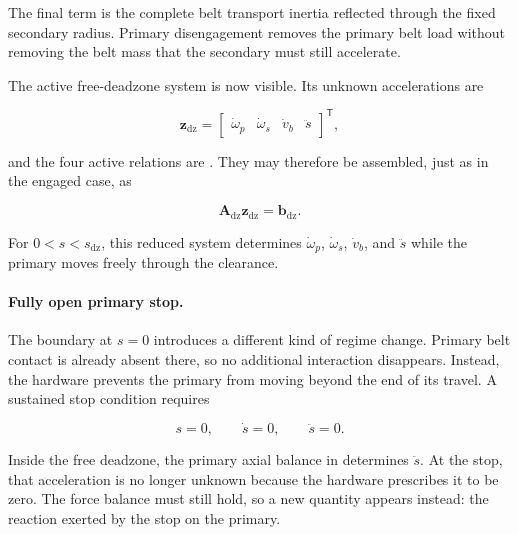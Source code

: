 \documentclass[11pt]{report}
\numberwithin{equation}{section}
\begin{document}
The final term is the complete belt transport inertia reflected through the
fixed secondary radius. Primary disengagement removes the primary belt load
without removing the belt mass that the secondary must still accelerate.

The active free-deadzone system is now visible. Its unknown accelerations are

\begin{equation}
    \mathbf z_{\mathrm{dz}}
    =
    \begin{bmatrix}
        \dot\omega_p &
        \dot\omega_s &
        \dot v_b &
        \ddot s
    \end{bmatrix}^{\mathsf T},
    \label{eq:deadzone_linear_unknowns}
\end{equation}

and the four active relations are
.
They may therefore be assembled, just as in the engaged case, as

\begin{equation}
    \mathbf A_{\mathrm{dz}}\mathbf z_{\mathrm{dz}}
    =
    \mathbf b_{\mathrm{dz}}.
    \label{eq:deadzone_linear_mechanical_core}
\end{equation}

For \(0<s<s_{\mathrm{dz}}\), this reduced system determines
\(\dot\omega_p\), \(\dot\omega_s\), \(\dot v_b\), and \(\ddot s\) while the
primary moves freely through the clearance.

\paragraph{Fully open primary stop.}
The boundary at \(s=0\) introduces a different kind of regime change. Primary
belt contact is already absent there, so no additional interaction
disappears. Instead, the hardware prevents the primary from moving beyond the
end of its travel. A sustained stop condition requires

\begin{equation}
    s=0,
    \qquad
    \dot s=0,
    \qquad
    \ddot s=0.
    \label{eq:lower_stop_kinematic_constraint}
\end{equation}

Inside the free deadzone, the primary axial balance in
 determines \(\ddot s\). At the stop,
that acceleration is no longer unknown because the hardware prescribes it to
be zero. The force balance must still hold, so a new quantity appears instead:
the reaction exerted by the stop on the primary.
\end{document}
